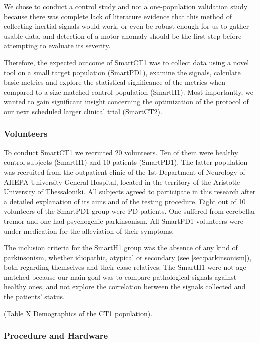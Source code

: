 We chose to conduct a control study and not a one-population validation study because there was complete lack of literature evidence that this method of collecting inertial signals would work, or even be robust enough for us to gather usable data, and detection of a motor anomaly should be the first step before attempting to evaluate its severity. 

Therefore, the expected outcome of \gls{SmartCT1} was to collect data using a novel tool on a small target population (\gls{SmartPD1}), examine the signals, calculate basic metrics and explore the statistical significance of the metrics when compared to a size-matched control population (\gls{SmartH1}). Most importantly, we wanted to gain significant insight concerning the optimization of the protocol of our next scheduled larger clinical trial (\gls{SmartCT2}).

\subsubsection{Volunteers}
\label{subsubsec:smartCT1Volunteers}

To conduct \gls{SmartCT1} we recruited 20 volunteers. Ten of them were healthy control subjects (\gls{SmartH1}) and 10 patients (\gls{SmartPD1}). The latter population was recruited from the outpatient clinic of the 1st Department of Neurology of AHEPA University General Hospital, located in the territory of the Aristotle University of Thessaloniki. All subjects agreed to participate in this research after a detailed explanation of its aims and of the testing procedure. Eight out of 10 volunteers of the \gls{SmartPD1} group were \gls{PD} patients. One suffered from cerebellar tremor and one had psychogenic parkinsonism. All \gls{SmartPD1} volunteers were under medication for the alleviation of their symptoms.

The inclusion criteria for the \gls{SmartH1} group was the absence of any kind of parkinsonism, whether idiopathic, atypical or secondary (see \ref{sec:parkinsonism}), both regarding themselves and their close relatives. The \gls{SmartH1} were not age-matched because our main goal was to compare pathological signals against healthy ones, and not explore the correlation between the signals collected and the patients' status. 

(\textcolor{BurntOrange}{Table X Demographics of the CT1 population}).

\subsubsection{Procedure and Hardware}
\label{subsubsec:smartCT1ProcHardware}

